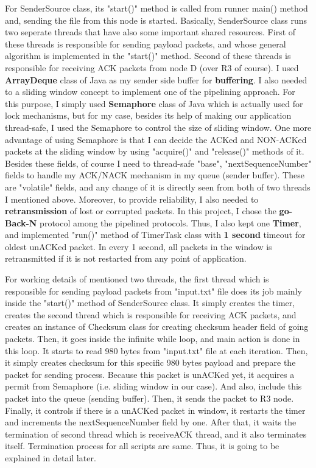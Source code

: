 \documentclass[12pt]{article}
\begin{document}
For SenderSource class, its "start()" method is called from runner main() method and, sending the file from this node is started. Basically, SenderSource class runs two seperate threads that have also some important shared resources. First of these threads is responsible for sending payload packets, and whose general algorithm is implemented in the "start()" method. Second of these threads is responsible for receiving ACK packets from node D (over R3 of course). I used \textbf{ArrayDeque} class of Java as my sender side buffer for \textbf{buffering}. I also needed to a sliding window concept to implement one of the pipelining approach. For this purpose, I simply used \textbf{Semaphore} class of Java which is actually used for lock mechanisms, but for my case, besides its help of making our application thread-safe, I used the Semaphore to control the size of sliding window. One more advantage of using Semaphore is that I can decide the ACKed and NON-ACKed packets at the sliding window by using "acquire()" and "release()" methods of it. Besides these fields, of course I need to thread-safe "base", "nextSequenceNumber" fields to handle my ACK/NACK mechanism in my queue (sender buffer). These are "volatile" fields, and any change of it is directly seen from both of two threads I mentioned above. Moreover, to provide reliability, I also needed to \textbf{retransmission} of lost or corrupted packets. In this project, I chose the \textbf{go-Back-N} protocol among the pipelined protocols. Thus, I also kept one \textbf{Timer}, and implemented "run()" method of TimerTask class with \textbf{1 second} timeout for oldest unACKed packet. In every 1 second, all packets in the window is retransmitted if it is not restarted from any point of application.

For working details of mentioned two threads, the first thread which is responsible for sending payload packets from "input.txt" file does its job mainly inside the "start()" method of SenderSource class. It simply creates the timer, creates the second thread which is responsible for receiving ACK packets, and creates an instance of Checksum class for creating checksum header field of going packets. Then, it goes inside the infinite while loop, and main action is done in this loop. It starts to read 980 bytes from "input.txt" file at each iteration. Then, it simply creates checksum for this specific 980 bytes payload and prepare the packet for sending process. Because this packet is unACKed yet, it acquires a permit from Semaphore (i.e. sliding window in our case). And also, include this packet into the queue (sending buffer). Then, it sends the packet to R3 node. Finally, it controls if there is a unACKed packet in window, it restarts the timer and increments the nextSequenceNumber field by one. After that, it waits the termination of second thread which is receiveACK thread, and it also terminates itself. Termination process for all scripts are same. Thus, it is going to be explained in detail later.
\end{document}
